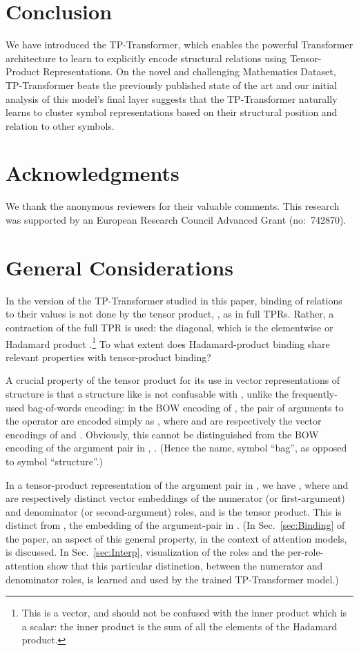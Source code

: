 \documentclass[11pt,a4paper]{article}
\newcommand{\ischl}[1]{{#1}}
\begin{document}
\section{Conclusion}  \label{sec:Conclusion}
We have introduced the TP-Transformer, which enables the powerful Transformer architecture to learn to explicitly encode structural relations using Tensor-Product Representations. 
On the novel and challenging Mathematics Dataset, \ischl{TP-Transformer beats the previously published state of the art and our initial analysis} of this model's final layer suggests that the TP-Transformer naturally learns to cluster symbol representations based on their structural position and relation to other symbols.

\section{Acknowledgments}
We thank the anonymous reviewers for their valuable comments.
This research was supported by an European
Research Council Advanced Grant (no:~742870).




\appendix
\section{General Considerations}

In the version of the TP-Transformer studied in this paper, binding of relations  to their values  is not done by the tensor product, , as in full TPRs.
Rather, a contraction of the full TPR is used: the diagonal, which is the elementwise or Hadamard product .\footnote{This is a vector, and should not be confused with the inner product  which is a scalar: the inner product is the sum of all the elements of the Hadamard product.}
To what extent does Hadamard-product binding share relevant properties with tensor-product binding?

A crucial property of the tensor product for its use in vector representations of structure is that a structure like  is not confusable with , unlike the frequently-used bag-of-words encoding: in the BOW encoding of , the pair of arguments to the operator are encoded simply as , where  and  are respectively the vector encodings of  and . 
Obviously, this cannot be distinguished from the BOW encoding of the argument pair in , . (Hence the name, symbol ``bag'', as opposed to symbol ``structure''.)

In a tensor-product representation of the argument pair in , we have , where  and  are respectively distinct vector embeddings of the numerator (or first-argument) and denominator (or second-argument) roles, and  is the tensor product. 
This is distinct from , the embedding of the argument-pair in . 
(In Sec.~\ref{sec:Binding} of the paper, an aspect of this general property, in the context of attention models, is discussed. 
In Sec.~\ref{sec:Interp}, visualization of the roles and the per-role-attention show that this particular distinction, between the numerator and denominator roles, is learned and used by the trained TP-Transformer model.)
\end{document}
